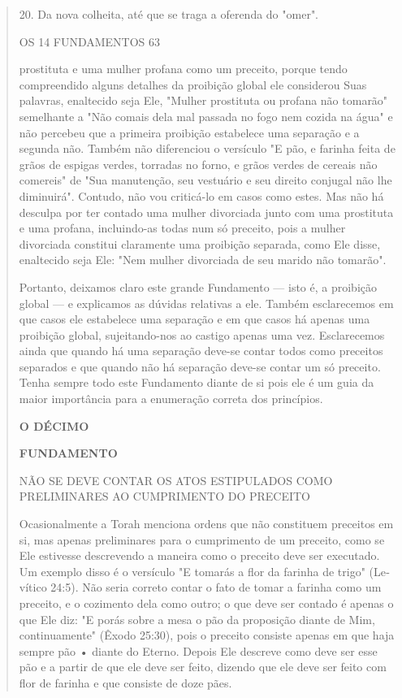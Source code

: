 \begin{quote}
20. Da nova colheita, até que se traga a oferenda do "omer".

OS 14 FUNDAMENTOS 63

prostituta e uma mulher profana como um preceito, porque tendo
compreen­dido alguns detalhes da proibição global ele considerou Suas
palavras, enalteci­do seja Ele, "Mulher prostituta ou profana não
tomarão" semelhante a "Não comais dela mal passada no fogo nem cozida na
água" e não percebeu que a primeira proibição estabelece uma separação e
a segunda não. Também não di­ferenciou o versículo "E pão, e farinha
feita de grãos de espigas verdes, torra­das no forno, e grãos verdes de
cereais não comereis" de "Sua manutenção, seu vestuário e seu direito
conjugal não lhe diminuirá". Contudo, não vou cri­ticá-lo em casos como
estes. Mas não há desculpa por ter contado uma mulher divorciada junto
com uma prostituta e uma profana, incluindo-as todas num só preceito,
pois a mulher divorciada constitui claramente uma proibição sepa­rada,
como Ele disse, enaltecido seja Ele: "Nem mulher divorciada de seu
mari­do não tomarão".

Portanto, deixamos claro este grande Fundamento --- isto é, a proi­bição
global --- e explicamos as dúvidas relativas a ele. Também esclarecemos
em que casos ele estabelece uma separação e em que casos há apenas uma
proi­bição global, sujeitando-nos ao castigo apenas uma vez.
Esclarecemos ainda que quando há uma separação deve-se contar todos como
preceitos separados e que quando não há separação deve-se contar um só
preceito. Tenha sempre todo este Fundamento diante de si pois ele é um
guia da maior importância para a enumeração correta dos princípios.

\textbf{O DÉCIMO}

\textbf{FUNDAMENTO}

NÃO SE DEVE CONTAR OS ATOS ESTIPULADOS COMO PRELIMINARES AO CUMPRIMENTO
DO PRECEITO

Ocasionalmente a Torah menciona ordens que não constituem pre­ceitos em
si, mas apenas preliminares para o cumprimento de um preceito, co­mo se
Ele estivesse descrevendo a maneira como o preceito deve ser executa­do.
Um exemplo disso é o versículo "E tomarás a flor da farinha de trigo"
(Le­vítico 24:5). Não seria correto contar o fato de tomar a farinha
como um pre­ceito, e o cozimento dela como outro; o que deve ser contado
é apenas o que Ele diz: "E porás sobre a mesa o pão da proposição diante
de Mim, continua­mente" (Êxodo 25:30), pois o preceito consiste apenas
em que haja sempre pão • diante do Eterno. Depois Ele descreve como deve
ser esse pão e a partir de que ele deve ser feito, dizendo que ele deve
ser feito com flor de farinha e que consiste de doze pães.


\end{quote}
